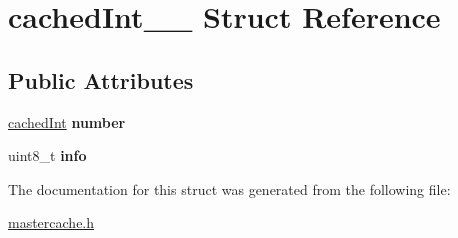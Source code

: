 \hypertarget{structcachedInt____}{}\section{cached\+Int\+\_\+\+\_\+ Struct Reference}
\label{structcachedInt____}
\subsection*{Public Attributes}
\begin{DoxyCompactItemize}
\item 
\hyperlink{mastercache_8h_a113c03970467afb459ed5ae157d0a870}{cached\+Int} {\bfseries number}\hypertarget{structcachedInt_____aa902c9c1483f69c0859464a621b4e3d5}{}\label{structcachedInt_____aa902c9c1483f69c0859464a621b4e3d5}

\item 
uint8\+\_\+t {\bfseries info}\hypertarget{structcachedInt_____a12c85d192562a6a2f3c52ad8d2d9bcb3}{}\label{structcachedInt_____a12c85d192562a6a2f3c52ad8d2d9bcb3}

\end{DoxyCompactItemize}


The documentation for this struct was generated from the following file\+:\begin{DoxyCompactItemize}
\item 
\hyperlink{mastercache_8h}{mastercache.\+h}\end{DoxyCompactItemize}
